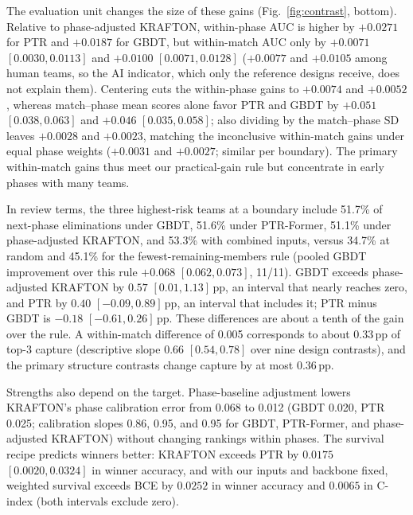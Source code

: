 \documentclass[sigconf,anonymous,nonacm]{acmart}
\begin{document}
The evaluation unit changes the size of these gains (Fig.~\ref{fig:contrast}, bottom). Relative to phase-adjusted KRAFTON, within-phase AUC is higher by $+0.0271$ for PTR and $+0.0187$ for GBDT, but within-match AUC only by $+0.0071$ $[0.0030,\allowbreak 0.0113]$ and $+0.0100$ $[0.0071,\allowbreak 0.0128]$ ($+0.0077$ and $+0.0105$ among human teams, so the AI indicator, which only the reference designs receive, does not explain them). Centering cuts the within-phase gains to $+0.0074$ and $+0.0052$, whereas match--phase mean scores alone favor PTR and GBDT by $+0.051$ $[0.038,\allowbreak 0.063]$ and $+0.046$ $[0.035,\allowbreak 0.058]$; also dividing by the match--phase SD leaves $+0.0028$ and $+0.0023$, matching the inconclusive within-match gains under equal phase weights ($+0.0031$ and $+0.0027$; similar per boundary). The primary within-match gains thus meet our practical-gain rule but concentrate in early phases with many teams.

In review terms, the three highest-risk teams at a boundary include 51.7\% of next-phase eliminations under GBDT, 51.6\% under PTR-Former, 51.1\% under phase-adjusted KRAFTON, and 53.3\% with combined inputs, versus 34.7\% at random and 45.1\% for the fewest-remaining-members rule (pooled GBDT improvement over this rule $+0.068$ $[0.062,\allowbreak 0.073]$, 11/11). GBDT exceeds phase-adjusted KRAFTON by $0.57$ $[0.01,\allowbreak 1.13]$\,pp, an interval that nearly reaches zero, and PTR by $0.40$ $[-0.09,\allowbreak 0.89]$\,pp, an interval that includes it; PTR minus GBDT is $-0.18$ $[-0.61,\allowbreak 0.26]$\,pp. These differences are about a tenth of the gain over the rule. A within-match difference of 0.005 corresponds to about 0.33\,pp of top-3 capture (descriptive slope 0.66 $[0.54,\allowbreak 0.78]$ over nine design contrasts), and the primary structure contrasts change capture by at most 0.36\,pp.

Strengths also depend on the target. Phase-baseline adjustment lowers KRAFTON's phase calibration error from 0.068 to 0.012 (GBDT 0.020, PTR 0.025; calibration slopes 0.86, 0.95, and 0.95 for GBDT, PTR-Former, and phase-adjusted KRAFTON) without changing rankings within phases. The survival recipe predicts winners better: KRAFTON exceeds PTR by $0.0175$ $[0.0020,\allowbreak 0.0324]$ in winner accuracy, and with our inputs and backbone fixed, weighted survival exceeds BCE by $0.0252$ in winner accuracy and $0.0065$ in C-index (both intervals exclude zero).


\end{document}
